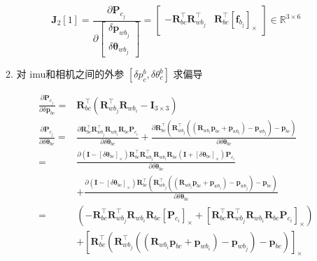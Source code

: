 \documentclass[12pt,a4paper]{article}
\begin{document}
\begin{enumerate}
\begin{enumerate}
\begin{equation}
\mathbf{J}_2[1]
=
\frac{\partial \mathbf{P}_{c_{j}}}
{\partial \left[\begin{array}{c}{\delta \mathbf{p}_{w b_{j}}} \\ 
{\delta \boldsymbol{\theta}_{w b_{j}}}\end{array}\right]} 
=
\begin{bmatrix}
-\mathbf{R}_{b c}^{\top} \mathbf{R}_{w b_{j}}^{\top} 
& 
\mathbf{R}_{b c}^{\top}\left[\mathbf{f}_{b_{j}}\right]_{\times}
\end{bmatrix}
\in \mathbb{R}^{3 \times 6}
\end{equation}

\item 对 {\color{blue}imu和相机之间的外参 $[\delta p^{b}_{c},\delta \theta ^{b}_{c}]$} 求偏导

\begin{equation}
\begin{aligned}
\frac{\partial \mathbf{P}_{c_{j}}}{\partial \delta \mathbf{p}_{bc}} 
={}& 
\mathbf{R}_{b c}^{\top}\left(\mathbf{R}_{w b_{j}}^{\top} \mathbf{R}_{w b_{i}}-\mathbf{I}_{3 \times 3}\right) 
\\
\frac{\partial \mathbf{P}_{c_{j}}}{\partial \delta \boldsymbol{\theta}_{bc}} 
={}&
\frac{\partial 
\mathbf{R}_{b c}^{\top} 
\mathbf{R}_{w b_{j}}^{\top} 
\mathbf{R}_{w b_{i}} 
\mathbf{R}_{b c} 
\mathbf{P}_{c_i}}
{\partial \delta \boldsymbol{\theta}_{bc}} 
+
\frac{\partial 
\mathbf{R}_{b c}^{\top}
\left(\mathbf{R}_{w b_{j}}^{\top} 
\left(\left(\mathbf{R}_{w b_{i}} \mathbf{p}_{b c}+\mathbf{p}_{w b_{i}}\right)
-\mathbf{p}_{w b_{j}}\right)-\mathbf{p}_{b c}\right)}
{\partial \delta \boldsymbol{\theta}_{bc}} \\
={}&
\frac{\partial 
\left(\mathbf{I}-\left[\delta \boldsymbol{\theta}_{bc}\right]_{\times}\right)
\mathbf{R}_{b c}^{\top} 
\mathbf{R}_{w b_{j}}^{\top} 
\mathbf{R}_{w b_{i}} 
\mathbf{R}_{b c} 
\left(\mathbf{I}+\left[\delta \boldsymbol{\theta}_{bc}\right]_{\times}\right)
\mathbf{P}_{c_i}}
{\partial \delta \boldsymbol{\theta}_{bc}} \\
&+
\frac{\partial 
\left(\mathbf{I}-\left[\delta \boldsymbol{\theta}_{bc}\right]_{\times}\right)
\mathbf{R}_{b c}^{\top}
\left(\mathbf{R}_{w b_{j}}^{\top} 
\left(\left(\mathbf{R}_{w b_{i}} \mathbf{p}_{b c}+\mathbf{p}_{w b_{i}}\right)
-\mathbf{p}_{w b_{j}}\right)-\mathbf{p}_{b c}\right)}
{\partial \delta \boldsymbol{\theta}_{bc}} \\
={}&
\left(-\mathbf{R}_{b c}^{\top} \mathbf{R}_{w b_{j}}^{\top} \mathbf{R}_{w b_{i}} \mathbf{R}_{b c}\left[\mathbf{P}_{c_{i}}\right]_{\times} + \left[\mathbf{R}_{b c}^{\top} \mathbf{R}_{w b_{j}}^{\top} \mathbf{R}_{w b_{i}} \mathbf{R}_{b c} \mathbf{P}_{c_{i}}\right]_{\times}\right) \\
&+
\left[\mathbf{R}_{b c}^{\top}\left(\mathbf{R}_{w b_{j}}^{\top}\left(\left(\mathbf{R}_{w b_{i}} \mathbf{p}_{b c}+\mathbf{p}_{w b_{i}}\right)-\mathbf{p}_{w b_{j}}\right)-\mathbf{p}_{b c}\right)\right]_{\times}
\end{aligned}
\end{equation}


\end{enumerate}
\end{enumerate}
\end{document}
